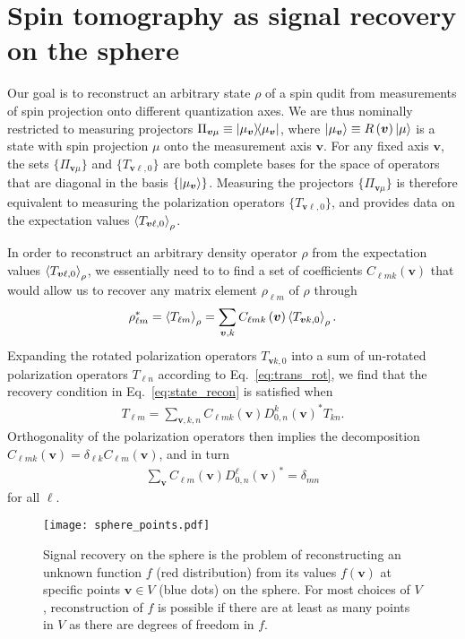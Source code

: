 \documentclass[nofootinbib,twocolumn]{revtex4-1}
\newcommand{\p}[1]{\left(#1\right)} %
\newcommand{\bk}{\Braket} %
\renewcommand{\set}[1]{\{#1\}} %
\begin{document}
\section{Spin tomography as signal recovery on the sphere}
\label{sec:signal_recovery}

Our goal is to reconstruct an arbitrary state $\rho$ of a spin qudit from measurements of spin projection onto different quantization axes.
We are thus nominally restricted to measuring projectors $\Pi_{\bm v\mu} \equiv \op{\mu_{\bm v}}$, where $\ket{\mu_{\bm v}}\equiv R\p{\bm v}\ket{\mu}$ is a state with spin projection $\mu$ onto the measurement axis $\bm v$.
For any fixed axis $\bm v$, the sets $\set{\Pi_{\bm v\mu}}$ and $\set{T_{\bm v\ell,0}}$ are both complete bases for the space of operators that are diagonal in the basis $\set{\ket{\mu_{\bm v}}}$.
Measuring the projectors $\set{\Pi_{\bm v\mu}}$ is therefore equivalent to measuring the polarization operators $\set{T_{\bm v\ell,0}}$, and provides data on the expectation values $\bk{T_{\bm v\ell,0}}_\rho$.

In order to reconstruct an arbitrary density operator $\rho$ from the expectation values $\bk{T_{\bm v\ell,0}}_\rho$, we essentially need to to find a set of coefficients $C_{\ell mk}\p{\bm v}$ that would allow us to recover any matrix element $\rho_{\ell m}$ of $\rho$ through
\begin{align}
  \rho_{\ell m}^* = \bk{T_{\ell m}}_\rho
  = \sum_{\bm v,k} C_{\ell mk}\p{\bm v} \bk{T_{\bm vk,0}}_\rho.
  \label{eq:state_recon}
\end{align}
Expanding the rotated polarization operators $T_{\bm vk,0}$ into a sum of un-rotated polarization operators $T_{\ell n}$ according to Eq.~\eqref{eq:trans_rot}, we find that the recovery condition in Eq.~\eqref{eq:state_recon} is satisfied when
\begin{align}
  T_{\ell m}
  = \sum_{\bm v,k,n} C_{\ell mk}\p{\bm v} D^k_{0,n}\p{\bm v}^* T_{kn}.
\end{align}
Orthogonality of the polarization operators then implies the decomposition $C_{\ell mk}\p{\bm v}=\delta_{\ell k}C_{\ell m}\p{\bm v}$, and in turn
\begin{align}
  \sum_{\bm v} C_{\ell m}\p{\bm v} D^\ell_{0,n}\p{\bm v}^*
  = \delta_{mn}
  \label{eq:tomo_recovery}
\end{align}
for all $\ell$.

\begin{figure}
  \centering
  \texttt{[image: sphere\_points.pdf]}
  \caption{Signal recovery on the sphere is the problem of reconstructing an unknown function $f$ (red distribution) from its values $f\p{\bm v}$ at specific points $\bm v\in V$ (blue dots) on the sphere.
    For most choices of $V$, reconstruction of $f$ is possible if there are at least as many points in $V$ as there are degrees of freedom in $f$.}
  \label{fig:sphere_points}
\end{figure}
\end{document}
